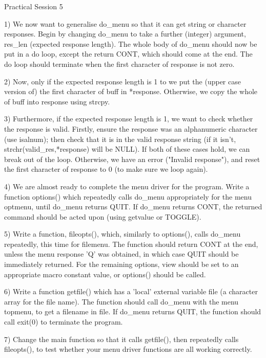 Practical Session 5

1) We  now want  to generalise do_menu so that it can get string or character
responses. Begin  by changing  do_menu to  take a further (integer) argument,
res_len (expected  response length).  The whole body of do_menu should now be
put in  a do  loop, except the return CONT, which should come at the end. The
do loop should terminate when the first character of response is not zero.

2) Now,  only if  the expected response length is 1 to we put the (upper case
version of)  the first character of buff in *response. Otherwise, we copy the
whole of buff into response using strcpy.

3) Furthermore,  if the  expected response  length is  1, we  want  to  check
whether  the   response  is  valid.  Firstly,  ensure  the  response  was  an
alphanumeric character  (use isalnum);  then check  that it  is in  the valid
response string  (if it  isn't, strchr(valid_res,*response) will be NULL). If
both of these cases hold, we can break out of the loop. Otherwise, we have an
error ("Invalid  response"), and  reset the  first character of response to 0
(to make sure we loop again).

4) We  are almost  ready to complete the menu driver for the program. Write a
function options()  which repeatedly calls do_menu appropriately for the menu
optmenu, until  do_menu returns  QUIT. If  do_menu returns CONT, the returned
command should be acted upon (using getvalue or TOGGLE).

5) Write a function, fileopts(), which, similarly to options(), calls do_menu
repeatedly, this  time for  filemenu. The  function should return CONT at the
end, unless  the menu response 'Q' was obtained, in which case QUIT should be
immediately returned.  For the  remaining options,  view should  be set to an
appropriate macro constant value, or options() should be called.

6) Write  a function  getfile() which has a 'local' external variable file (a
character array for the file name). The function should call do_menu with the
menu topmenu,  to get  a filename  in file.  If  do_menu  returns  QUIT,  the
function should call exit(0) to terminate the program.

7) Change the main function so that it calls getfile(), then repeatedly calls
fileopts(), to  test whether  your menu  driver  functions  are  all  working
correctly.
